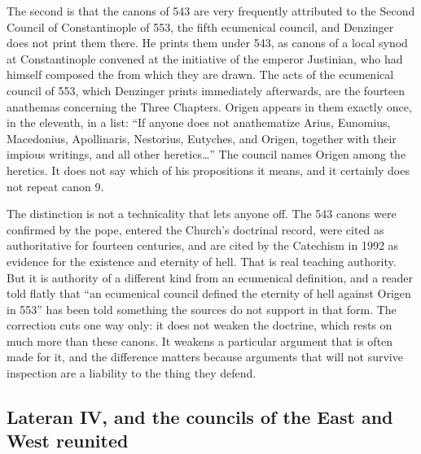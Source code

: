The second is that the canons of 543 are very frequently attributed to the Second Council of Constantinople of 553, the fifth ecumenical council, and Denzinger does not print them there. He prints them under 543, as canons of a local synod at Constantinople convened at the initiative of the emperor Justinian, who had himself composed the  from which they are drawn. The acts of the ecumenical council of 553, which Denzinger prints immediately afterwards, are the fourteen anathemas concerning the Three Chapters. Origen appears in them exactly once, in the eleventh, in a list: ``If anyone does not anathematize Arius, Eunomius, Macedonius, Apollinaris, Nestorius, Eutyches, and Origen, together with their impious writings, and all other heretics\ldots{}'' The council names Origen among the heretics. It does not say which of his propositions it means, and it certainly does not repeat canon 9.

The distinction is not a technicality that lets anyone off. The 543 canons were confirmed by the pope, entered the Church's doctrinal record, were cited as authoritative for fourteen centuries, and are cited by the Catechism in 1992 as evidence for the existence and eternity of hell. That is real teaching authority. But it is authority of a different kind from an ecumenical definition, and a reader told flatly that ``an ecumenical council defined the eternity of hell against Origen in 553'' has been told something the sources do not support in that form. The correction cuts one way only: it does not weaken the doctrine, which rests on much more than these canons. It weakens a particular argument that is often made for it, and the difference matters because arguments that will not survive inspection are a liability to the thing they defend.

\subsection{Lateran IV, and the councils of the East and West reunited}

